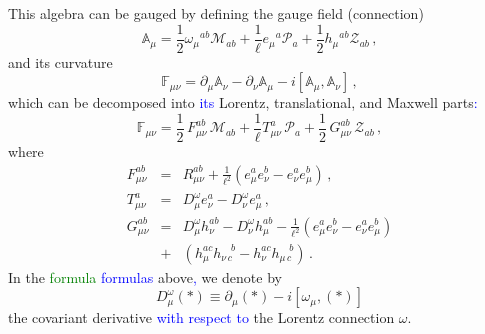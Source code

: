 \documentclass[prd,reprint,eqsecnum,nofootinbib]{revtex4-1}
\begin{document}
This algebra can be gauged by defining the gauge field (connection)
\begin{equation}\label{2}
\mathbb{A}_{\mu}=\frac{1}{2}\omega_\mu{}^{ab}
\mathcal{M}_{ab}+\frac{1}{\ell}e_\mu{}^{a}
\mathcal{P}_{a}+\frac{1}{2}h_\mu{}^{ab} \mathcal{Z}_{ab}\,,
\end{equation}
and its curvature
\begin{equation}\label{3}
\mathbb{F}_{\mu\nu}=\partial_\mu\mathbb{A}_{\nu}-\partial_\nu\mathbb{A}_{\mu}-i[\mathbb{A}_{\mu},\mathbb{A}_{\nu}]\,,
\end{equation}
which can be decomposed into \textcolor{blue}{its} Lorentz, translational, and Maxwell
parts\textcolor{blue}{:}
\begin{equation}\label{4}
\mathbb{F}_{\mu\nu}=\frac12\, F_{\mu\nu}^{ab}\, \mathcal{M}_{ab}
+\frac{1}{\ell}T_{\mu\nu}^{a}\,\mathcal{P}_{a}+ \frac12\,
G_{\mu\nu}^{ab}\, \mathcal{Z}_{ab}\,,
\end{equation}
where
\begin{eqnarray}
F_{\mu\nu}^{ab}&=&R^{ab}_{\mu\nu}+\frac{1}{\ell^2}( e^a_\mu e^b_\nu- e^a_\nu e^b_\mu) \,,\label{5a}\\
T_{\mu\nu}^{a}&=&D^\omega_\mu e^a_\nu -D^\omega_\nu e^a_\mu\,,\label{5b}\\
G_{\mu\nu}^{ab}&=&D^\omega_\mu h^{ab}_\nu -D^\omega_\nu
h^{ab}_\mu\nonumber-\frac{1}{\ell^2}( e^a_\mu e^b_\nu- e^a_\nu
e^b_\mu)\\ &+&(h^{ac}_\mu h^{\quad b}_{\nu\,c}-h^{ac}_\nu h^{\quad
b}_{\mu\,c})\, .\label{5c}
\end{eqnarray}
In the \textcolor{green}{formula} \textcolor{blue}{formulas} above\textcolor{blue}{,} we denote by $$D^\omega_\mu(\ast)\equiv
\partial_\mu(\ast)-i[\omega_\mu,(\ast)]$$ the covariant
derivative \textcolor{blue}{with respect to} the Lorentz connection $\omega$.
\end{document}
